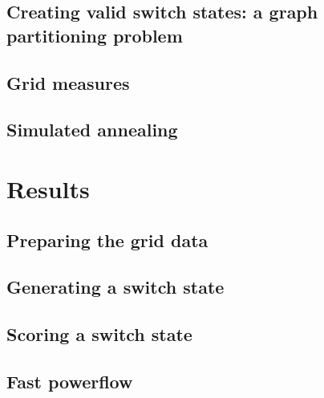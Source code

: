 \documentclass[a4paper]{report}
\begin{document}


\section{Creating valid switch states: a graph partitioning problem}





\section{Grid measures}



\section{Simulated annealing}



\chapter{Results}

\section{Preparing the grid data}



\section{Generating a switch state}



\section{Scoring a switch state}



\section{Fast powerflow}
\end{document}
